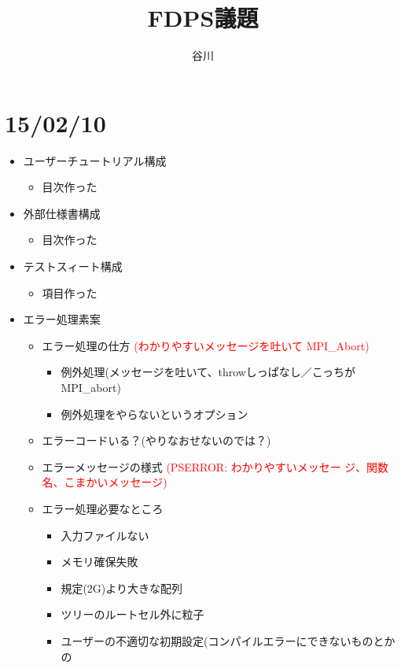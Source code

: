 \documentclass[12pt,a4paper]{jarticle}
\title{FDPS議題}
\author{谷川}
\date{}
\newcommand{\redtext}[1]{\textcolor{red}{#1}}
\begin{document}
\maketitle
\tableofcontents

\newpage

\section{15/02/10}

\begin{itemize}
\item ユーザーチュートリアル構成
  \begin{itemize}
  \item 目次作った
  \end{itemize}
\item 外部仕様書構成
  \begin{itemize}
  \item 目次作った
  \end{itemize}
\item テストスィート構成
  \begin{itemize}
  \item 項目作った
  \end{itemize}
\item エラー処理素案
  \begin{itemize}
  \item エラー処理の仕方 \redtext{(わかりやすいメッセージを吐いて
    MPI\_Abort)}
    \begin{itemize}
    \item 例外処理(メッセージを吐いて、throwしっぱなし／こっちが
      MPI\_abort)
    \item 例外処理をやらないというオプション
    \end{itemize}    
  \item エラーコードいる？(やりなおせないのでは？)
  \item エラーメッセージの様式 \redtext{(PSERROR: わかりやすいメッセー
    ジ、関数名、こまかいメッセージ)}
  \item エラー処理必要なところ
    \begin{itemize}
    \item 入力ファイルない
    \item メモリ確保失敗
    \item 規定(2G)より大きな配列
    \item ツリーのルートセル外に粒子
    \item ユーザーの不適切な初期設定(コンパイルエラーにできないものとかの

\end{itemize}
\end{itemize}
\end{itemize}
\end{document}

